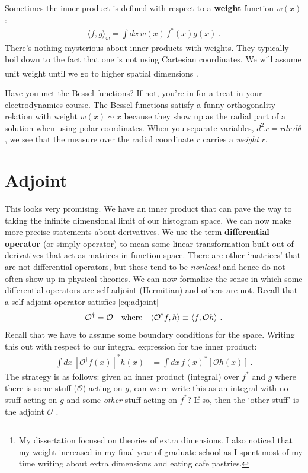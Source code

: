\documentclass[12pt, oneside]{report}    %
\let\oldsection\section
\def\section{%
  \setcounter{sidenote}{1}%
  \oldsection
}
\begin{document}
Sometimes the inner product is defined with respect to a \textbf{weight} function $w(x)$:
\begin{align}
  \langle f,g\rangle_w 
  =
  \int dx\, w(x)\, f^*(x)g(x) \ .
  \label{eq:weighted:inner:product}
\end{align}
There's nothing mysterious about inner products with weights. They typically boil down to the fact that one is not using Cartesian coordinates. We will assume unit weight until we go to higher spatial dimensions\footnote{My dissertation focused on theories of extra dimensions. I also noticed that my weight increased in my final year of graduate school as I spent most of my time writing about extra dimensions and eating cafe pastries.}.
\begin{example}
Have you met the Bessel functions? If not, you're in for a treat in your electrodynamics course. The Bessel functions satisfy a funny orthogonality relation with weight $w(x)\sim x$ because they show up as the radial part of a solution when using polar coordinates. When you separate variables, $d^2x = rdr\,d\theta$, we see that the measure over the radial coordinate $r$ carries a \emph{weight} $r$.
\end{example}

\section{Adjoint}

This looks very promising. We have an inner product that can pave the way to taking the infinite dimensional limit of our histogram space. We can now make more precise statements about derivatives. We use the term \textbf{differential operator} (or simply operator) to mean some linear transformation built out of derivatives that act as matrices in function space. There are other `matrices'  that are not differential operators, but these tend to be \emph{nonlocal} and hence do not often show up in physical theories. We can now formalize the sense in which some differential operators are self-adjoint (Hermitian) and others are not. Recall that a self-adjoint operator satisfies \eqref{eq:adjoint}
\begin{align}
    \mathcal O^\dag &= \mathcal O
    &
    \textnormal{where}&
    &
    \langle \mathcal O^\dag f,h\rangle \equiv \langle f, \mathcal O h \rangle \ .
\end{align}
Recall that we have to assume some boundary conditions for the space. 
Writing this out with respect to our integral expression for the inner product:
\begin{align}
\int dx \, \left[\mathcal O^\dag f(x)\right]^*  h(x)
&=
  \int dx \, f(x)^* \left[\mathcal O h(x)\right]
   \ .
\end{align}
The strategy is as follows: given an inner product (integral) over $f^*$ and $g$ where there is some stuff ($\mathcal O$) acting on $g$, can we re-write this as an integral with no stuff acting on $g$ and some \emph{other} stuff acting on $f^*$? If so, then the `other stuff' is the adjoint $\mathcal O^\dag$.
\end{document}
